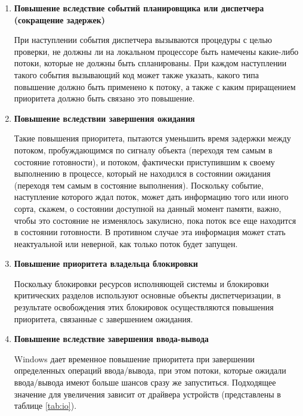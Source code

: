 \begin{enumerate}[label={\arabic*.}]
	\item \textbf{Повышение вследствие событий планировщика или диспетчера (сокращение задержек)}
	
	При наступлении события диспетчера вызываются процедуры с целью проверки, не должны ли на локальном процессоре быть намечены какие-либо потоки, которые не должны быть спланированы. При каждом наступлении такого события вызывающий код может также указать, какого типа повышение должно быть применено к потоку, а также с каким приращением приоритета должно быть связано это повышение.
	
%	
	
	
	\item \textbf{Повышение вследствии завершения ожидания}
	
	Такие повышения приоритета, пытаются уменьшить время задержки между потоком, пробуждающимся по сигналу объекта (переходя тем самым в состояние готовности), и потоком, фактически приступившим к своему выполнению в процессе, который не находился в состоянии ожидания (переходя тем самым в состояние выполнения). Поскольку событие, наступление которого ждал поток, может дать информацию того или иного сорта, скажем, о состоянии доступной на данный момент памяти, важно, чтобы это состояние не изменялось закулисно, пока поток все еще находится в состоянии готовности. В противном случае эта информация может стать неактуальной или неверной, как только поток будет запущен.
	
	\item \textbf{Повышение приоритета владельца блокировки}
	
	Поскольку блокировки ресурсов исполняющей системы и блокировки критических разделов используют основные объекты диспетчеризации, в результате освобождения этих блокировок осуществляются повышения приоритета, связанные с завершением ожидания.
	
	\item \textbf{Повышение вследствие завершения ввода-вывода }
	
	Windows дает временное повышение приоритета при завершении определенных операций ввода/вывода, при этом потоки, которые ожидали ввода/вывода имеют больше шансов сразу же запуститься. Подходящее значение для увеличения зависит от драйвера устройств (представлены в таблице \ref{tab:io}).


\end{enumerate}
